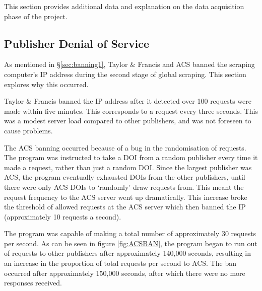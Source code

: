 \addtocounter{page}{1}

\label{sec:data_acc_appendix}
This section provides additional data and explanation on the data acquisition phase of the project.
\subsection{Publisher Denial of Service}
\label{sec:banning2}
As mentioned in \S\ref{sec:banning1}, Taylor \& Francis and ACS banned the scraping computer's IP address during the second stage of global scraping. This section explores why this occurred.

Taylor \& Francis banned the IP address after it detected over 100 requests were made within five minutes. This corresponds to a request every three seconds. This was a modest server load compared to other publishers, and was not foreseen to cause problems.

The ACS banning occurred because of a bug in the randomisation of requests. The program was instructed to take a DOI from a random publisher every time it made a request, rather than just a random DOI. Since the largest publisher was ACS, the program eventually exhausted DOIs from the other publishers, until there were only ACS DOIs to `randomly' draw requests from. This meant the request frequency to the ACS server went up dramatically. This increase broke the threshold of allowed requests at the ACS server which then banned the IP (approximately 10 requests a second).

The program was capable of making a total number of approximately 30 requests per second. As can be seen in figure \ref{fig:ACSBAN}, the program began to run out of requests to other publishers after approximately 140,000 seconds, resulting in an increase in the proportion of total requests per second to ACS. The ban occurred after approximately 150,000 seconds, after which there were no more responses received.
\newpage
\addtocounter{page}{-2}

